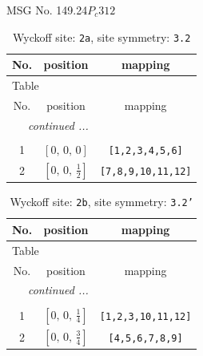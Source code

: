 \documentclass[fleqn,8pt]{jsarticle}
\begin{document}
\setcounter{MaxMatrixCols}{32}

\renewcommand{\tablename}{Table~}
\renewcommand{\figurename}{Figure~}
\begin{center}
\LARGE
MSG No. 149.24\quad$P_{c}312$
\end{center}
\renewcommand{\arraystretch}{1.2}
\begin{longtable}{ccc}
\caption{Wyckoff site: {\tt 2a}, site symmetry: {\tt 3.2}}
 \\
 \hline \hline
No. & position & mapping \\ \hline \endfirsthead

\multicolumn{2}{l}{\tablename\ \thetable{}} \\
 \hline \hline
No. & position & mapping \\ \hline \endhead

 \hline \hline
\multicolumn{2}{r}{\footnotesize\it continued ...} \\ \endfoot

 \hline \hline
\multicolumn{2}{r}{} \\ \endlastfoot

1 & $\left[ 0,\, 0,\, 0 \right]$ & {\tt [1,2,3,4,5,6]} \\ \hline
2 & $\left[ 0,\, 0,\, \frac{1}{2} \right]$ & {\tt [7,8,9,10,11,12]} \\
\end{longtable}
\renewcommand{\arraystretch}{1.2}
\begin{longtable}{ccc}
\caption{Wyckoff site: {\tt 2b}, site symmetry: {\tt 3.2'}}
 \\
 \hline \hline
No. & position & mapping \\ \hline \endfirsthead

\multicolumn{2}{l}{\tablename\ \thetable{}} \\
 \hline \hline
No. & position & mapping \\ \hline \endhead

 \hline \hline
\multicolumn{2}{r}{\footnotesize\it continued ...} \\ \endfoot

 \hline \hline
\multicolumn{2}{r}{} \\ \endlastfoot

1 & $\left[ 0,\, 0,\, \frac{1}{4} \right]$ & {\tt [1,2,3,10,11,12]} \\ \hline
2 & $\left[ 0,\, 0,\, \frac{3}{4} \right]$ & {\tt [4,5,6,7,8,9]} \\
\end{longtable}
\renewcommand{\arraystretch}{1.2}
\end{document}
